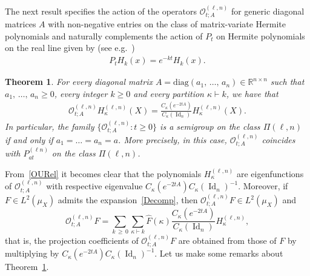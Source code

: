 \documentclass[10pt]{amsart}
\newtheorem{theo}{Theorem}[section]
\theoremstyle{definition}\newtheorem{defi}[theo]{Definition}\newtheorem{rema}[theo]{Remark}\newtheorem{exam}[theo]{Example}\newtheorem{exem}[theo]{Example}\newtheorem{nota}[theo]{Notation}
\DeclareMathOperator{\Id}{Id}
\newcommand{\diag}{\mathrm{diag}}
\newcommand{\clO}{\mathcal{O}}
\newcommand{\R}{\mathbb{R}}
\begin{document}
The next result specifies the action of the operators $\clO_{t;A}^{(\ell,n)}$ for generic diagonal matrices $A$ with non-negative entries on the class of matrix-variate Hermite polynomials and naturally complements the action of $P_t$ on Hermite polynomials on the real line given by (see e.g.~\cite[Proposition~1.4.2]{NP12})
\begin{gather}\label{ActPt}
P_t H_k(x) = e^{-kt} H_k(x).
\end{gather}

\begin{theo}\label{Action}
For every diagonal matrix $A=\diag(a_1,\,\ldots,\,a_n)\in \R^{n\times n}$ such that $a_1,\,\ldots,\,a_n\geq0$, every integer $k\geq0$ and every partition $\kappa \vdash k$, we have that
\begin{gather}\label{OURel}
\clO_{t;A}^{(\ell,n)}H_{\kappa}^{(\ell,n)}(X) = \frac{C_{\kappa}\left(e^{-2tA}\right)}{C_{\kappa}(\Id_n)}H_{\kappa}^{(\ell,n)}(X).
\end{gather}
In particular, the family $\{\clO_{t;A}^{(\ell,n)}:t\geq 0\}$ is a semigroup on the class $\Pi(\ell,n)$ if and only if $a_1=\ldots=a_n=a$. More precisely, in this case, $\clO_{t;A}^{(\ell,n)}$ coincides with $P_{at}^{(\ell n)}$ on the class $\Pi(\ell,n)$.
\end{theo}
From~\eqref{OURel} it becomes clear that the polynomials $H_{\kappa}^{(\ell,n)}$ are eigenfunctions of $\clO_{t;A}^{(\ell,n)}$ with respective eigenvalue $ C_{\kappa}(e^{-2tA}) C_{\kappa}(\Id_n)^{-1}$. Moreover, if $F \in L^2(\mu_X)$ admits the expansion~\eqref{Decomp}, then $\clO_{t;A}^{(\ell,n)}F \in L^2(\mu_X)$ and
\[
\clO_{t;A}^{(\ell,n)}F = \sum_{k\,\geq\,0}\sum_{\kappa\vdash k} \widehat{F}(\kappa)\frac{C_{\kappa}\left(e^{-2tA}\right)}{C_{\kappa}(\Id_n)} H_{\kappa}^{(\ell,n)},
\]
that is, the projection coefficients of $\clO_{t;A}^{(\ell,n)}F$ are obtained from those of $F$ by multiplying by $C_{\kappa}(e^{-2tA}) C_{\kappa}(\Id_n)^{-1}$. Let us make some remarks about Theorem~\ref{Action}.
\end{document}
